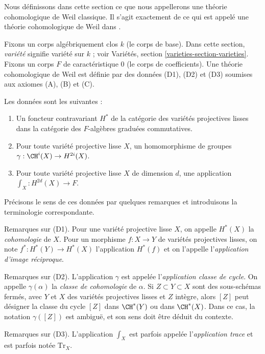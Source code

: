 \noindent
Nous définissons dans cette section ce que nous appellerons une théorie
cohomologique de Weil classique. Il s'agit exactement de ce qui est appelé
une théorie cohomologique de Weil dans \cite[section 1.2]{Kleiman-cycles}.

\medskip\noindent
Fixons un corps algébriquement clos $k$ (le corps de base).
Dans cette section, {\it variété} signifie variété sur $k$ ; voir
Variétés, section \ref{varieties-section-varieties}.
Fixons un corps $F$ de caractéristique $0$ (le corps de coefficients).
Une théorie cohomologique de Weil est définie par des données (D1), (D2) et (D3)
soumises aux axiomes (A), (B) et (C).

\medskip\noindent
Les données sont les suivantes :
\begin{enumerate}
\item[(D1)] Un foncteur contravariant $H^*$ de la catégorie
des variétés projectives lisses dans la catégorie des
$F$-algèbres graduées commutatives.
\item[(D2)] Pour toute variété projective lisse $X$,
un homomorphisme de groupes $\gamma : \CH^i(X) \to H^{2i}(X)$.
\item[(D3)] Pour toute variété projective lisse $X$ de dimension $d$,
une application $\int_X : H^{2d}(X) \to F$.
\end{enumerate}
Précisons le sens de ces données par quelques remarques
et introduisons la terminologie correspondante.

\medskip\noindent
Remarques sur (D1). Pour une variété projective lisse $X$,
on appelle $H^*(X)$ la {\it cohomologie} de $X$. Pour un morphisme
$f : X \to Y$ de variétés projectives lisses, on note
$f^* : H^*(Y) \to H^*(X)$ l'application $H^*(f)$ et on l'appelle
l'{\it application d'image réciproque}.

\medskip\noindent
Remarques sur (D2). L'application $\gamma$ est appelée l'{\it application classe de cycle}.
On appelle $\gamma(\alpha)$ la {\it classe de cohomologie} de $\alpha$.
Si $Z \subset Y \subset X$ sont des sous-schémas fermés, avec $Y$ et $X$
des variétés projectives lisses et $Z$ intègre, alors $[Z]$ peut
désigner la classe du cycle $[Z]$ dans $\CH^*(Y)$ ou dans $\CH^*(X)$.
Dans ce cas, la notation $\gamma([Z])$ est ambiguë, et son sens
doit être déduit du contexte.

\medskip\noindent
Remarques sur (D3). L'application $\int_X$ est parfois appelée
l'{\it application trace} et est parfois notée $\text{Tr}_X$.

